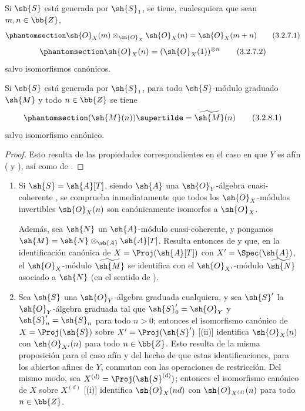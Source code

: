 \documentclass[oneside,10pt]{amsart}
\newcommand{\oldpage}[2][]{\marginnote{\normalfont\footnotesize\textbf{#1}~|~#2}\ignorespaces}
\let\EGAOriginalLabel\label
\renewcommand{\label}[1]{\phantomsection\EGAOriginalLabel{#1}}
\begin{document}
\begin{corollary}[3.2.7]
\label{II.3.2.7}
Si $\sh{S}$ está generada por $\sh{S}_1$, se tiene, cualesquiera que sean $m,n\in\bb{Z}$,
\[
\label{II.3.2.7.1}
  \sh{O}_X(m)\otimes_{\sh{O}_X}\sh{O}_X(n)=\sh{O}_X(m+n)
\tag{3.2.7.1}
\]
\[
\label{II.3.2.7.2}
  \sh{O}_X(n)=(\sh{O}_X(1))^{\otimes n}
\tag{3.2.7.2}
\]
salvo isomorfismos canónicos.
\end{corollary}

\oldpage[II]{56}

\begin{corollary}[3.2.8]
\label{II.3.2.8}
Si $\sh{S}$ está generada por $\sh{S}_1$, para todo $\sh{S}$-módulo graduado $\sh{M}$ y todo $n\in\bb{Z}$ se tiene
\[
\label{II.3.2.8.1}
  (\sh{M}(n))\supertilde=\widetilde{\sh{M}}(n)
\tag{3.2.8.1}
\]
salvo isomorfismo canónico.
\end{corollary}

\begin{proof}
Esto resulta de las propiedades correspondientes en el caso en que $Y$ es afín ( y ), así como de .
\end{proof}

\begin{remarks}[3.2.9]
\label{II.3.2.9}
\medskip\noindent
\begin{enumerate}
  \item Si $\sh{S}=\sh{A}[T]$, siendo $\sh{A}$ una $\sh{O}_Y$-álgebra cuasi-coherente , se comprueba inmediatamente que todos los $\sh{O}_X$-módulos invertibles $\sh{O}_X(n)$ son canónicamente isomorfos a $\sh{O}_X$.

    Además, sea $\sh{N}$ un $\sh{A}$-módulo cuasi-coherente, y pongamos $\sh{M}=\sh{N}\otimes_{\sh{A}}\sh{A}[T]$.
    Resulta entonces de  y  que, en la identificación canónica de $X=\Proj(\sh{A}[T])$ con $X'=\Spec(\sh{A})$, el $\sh{O}_X$-módulo $\widetilde{\sh{M}}$ se identifica con el $\sh{O}_{X'}$-módulo $\widetilde{\sh{N}}$ asociado a $\sh{N}$ (en el sentido de ).
  \item Sea $\sh{S}$ una $\sh{O}_Y$-álgebra graduada cualquiera, y sea $\sh{S}'$ la $\sh{O}_Y$-álgebra graduada tal que $\sh{S}'_0=\sh{O}_Y$ y $\sh{S}'_n=\sh{S}_n$ para todo $n>0$; entonces el isomorfismo canónico de $X=\Proj(\sh{S})$ sobre $X'=\Proj(\sh{S}')$ [(ii)] identifica $\sh{O}_X(n)$ con $\sh{O}_{X'}(n)$ para todo $n\in\bb{Z}$.
    Esto resulta de la misma proposición para el caso afín  y del hecho de que estas identificaciones, para los abiertos afines de $Y$, conmutan con las operaciones de restricción.
    Del mismo modo, sea $X^{(d)}=\Proj(\sh{S}^{(d)})$; entonces el isomorfismo canónico de $X$ sobre $X^{(d)}$ [(i)] identifica $\sh{O}_X(nd)$ con $\sh{O}_{X^{(d)}}(n)$ para todo $n\in\bb{Z}$.
\end{enumerate}
\end{remarks}
\end{document}
